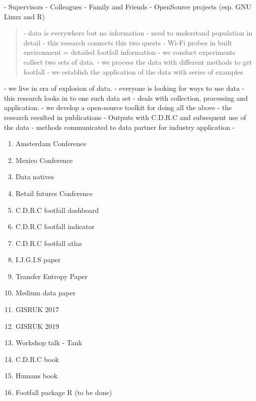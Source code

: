 \begin{acknowledgements}
- Supervisors
- Colleagues
- Family and Friends
- OpenSource projects (esp. GNU Linux and R)
\end{acknowledgements}

\begin{abstract}
 - data is everywhere but no information
 - need to understand population in detail
 - this research connects this two quests
 - Wi-Fi probes in built environment = detailed footfall information
 - we conduct experiments collect two sets of data.
 - we process the data with different methods to get footfall
 - we establish the application of the data with series of examples
\end{abstract}

\begin{impact_statement}
 - we live in era of explosion of data.
 - everyone is looking for ways to use data
 - this research looks in to one such data set
 - deals with collection, processing and application.
 - we develop a open-source toolkit for doing all the above
 - the research resulted in publications
 - Outputs with C.D.R.C and subsequent use of the data 
 - methods communicated to data partner for industry application 
 - \citep{gandomi2015beyond}
\end{impact_statement}

\begin{list_of_outputs}
    \begin{enumerate}
        \item Amsterdam Conference
        \item Mexico Conference
        \item Data natives
        \item Retail futures Conference 
        \item C.D.R.C footfall dashboard
        \item C.D.R.C footfall indicator
        \item C.D.R.C footfall atlas
        \item I.J.G.I.S paper
        \item Transfer Entropy Paper
        \item Medium data paper
        \item GISRUK 2017
        \item GISRUK 2019
        \item Workshop talk - Tank
        \item C.D.R.C book
        \item Humans book
        \item Footfall package R (to be done)
    \end{enumerate}
\end{list_of_outputs}

\tableofcontents
\listoffigures
\listoftables
